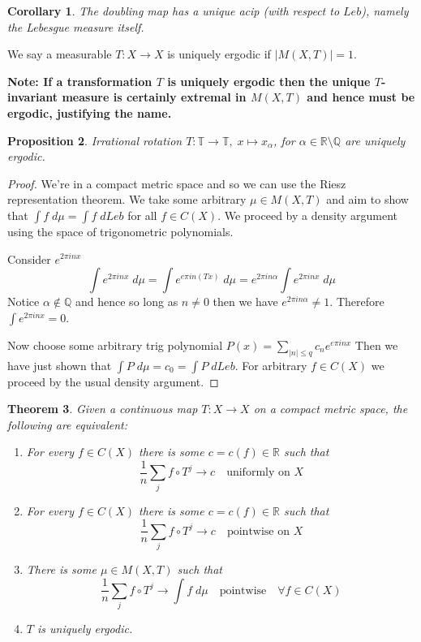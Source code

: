 \documentclass[11pt]{article}
\newcommand{\abs}[1]{\left|#1\right|}
\newcommand{\R}{\mathbb{R}}
\newcommand{\Q}{\mathbb{Q}}
\newcommand{\dm}{\;d\mu}
\newenvironment{defin}
	{\begin{mdframed}[backgroundcolor=white, roundcorner=5pt, linewidth=1pt, linecolor=RoyalBlue]}
	{\end{mdframed}}
\newcommand{\mdf}[1]{{\color{RoyalBlue} #1}}
\newenvironment{note}
	{\begin{mdframed}[backgroundcolor=white, linecolor=RubineRed, roundcorner=5pt, linewidth=1pt]\bfseries{Note:}\normalfont}
	{\end{mdframed}}
\newtheorem{prop}{Proposition}[section]
\newtheorem{theorem}[prop]{Theorem}
\newtheorem{cor}[prop]{Corollary}
\begin{document}
\begin{cor}
	The doubling map has a unique acip (with respect to $Leb$), namely the Lebesgue measure itself.
\end{cor}

\begin{defin}
	We say a measurable $T:X\to X$ is \mdf{uniquely ergodic} if $\abs{M(X, T)}=1$.
\end{defin}

\begin{note}
	If a transformation $T$ is uniquely ergodic then the unique $T$-invariant measure is certainly extremal in $M(X, T)$ and hence must be ergodic, justifying the name.
\end{note}

\begin{prop}
Irrational rotation $T:\mathbb{T}\to \mathbb{T}, \; x\mapsto x_\alpha$, for $\alpha\in\R\setminus\Q$ are uniquely ergodic.
\end{prop}

\begin{proof}
We're in a compact metric space and so we can use the Riesz representation theorem.
We take some arbitrary $\mu\in M(X, T)$ and aim to show that $\int f\;d\mu = \int f \;dLeb$ for all $f\in C(X)$.
We proceed by a density argument using the space of trigonometric polynomials.

Consider $e^{2\pi i n x}$
\[
	\int e^{2\pi i n x} \; d\mu = \int e^{e\pi i n (Tx)} \; d\mu = e^{2\pi i n \alpha}\int e^{2\pi i n x} \; d\mu
\]
Notice $\alpha\not\in \Q$ and hence so long as $n\neq 0$ then we have $e^{2\pi i n \alpha}\neq 1$.
Therefore $\int e^{2\pi i n x} = 0$.

Now choose some arbitrary trig polynomial $P(x) = \sum_{\abs{n}\leq q}c_n e^{e\pi i n x}$
Then we have just shown that $\int P \dm = c_0 = \int P \; dLeb$.
For arbitrary $f\in C(X)$ we proceed by the usual density argument.
\end{proof}

\begin{theorem}
Given a continuous map $T:X\to X$ on a compact metric space, the following are equivalent:
\begin{enumerate}[label=(\alph*)]
	\item For every $f\in C(X)$ there is some $c=c(f)\in \R$ such that
		\[
			\frac{1}{n}\sum_{j}f\circ T^j \to c\quad\text{uniformly on }X
		\]
	\item For every $f\in C(X)$ there is some $c=c(f)\in \R$ such that
		\[
			\frac{1}{n}\sum_{j}f\circ T^j \to c\quad\text{pointwise on }X
		\]
	\item There is some $\mu\in M(X, T)$ such that
		\[
			\frac{1}{n}\sum_{j}f\circ T^j \to \int f\dm \quad\text{pointwise}\quad\forall f\in C(X)
		\]
	\item $T$ is uniquely ergodic.
\end{enumerate}
\end{theorem}
\end{document}
